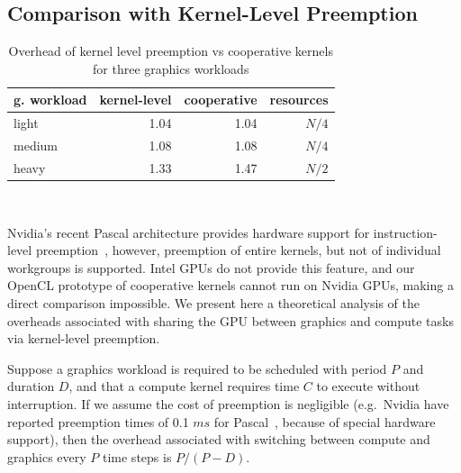 \documentclass[sigconf]{acmart}
\begin{document}
{%

\subsection{Comparison with Kernel-Level Preemption}\label{sec:nvidiacomparison}

\begin{table}[t]
\normalsize
\caption{Overhead of kernel level preemption vs cooperative kernels for three
graphics workloads}

\centering
\begin{tabular}{ l r r r}
g. workload &  kernel-level  & cooperative & resources \\
\hline
light & 1.04 & 1.04 & $N/4$\\
medium & 1.08 & 1.08 & $N/4$\\
heavy & 1.33 & 1.47 & $N/2$\\
\end{tabular} \\

\label{tab:preemption}
\end{table}

Nvidia's recent Pascal architecture provides hardware support for
instruction-level preemption~\cite{PascalWhitepaper,anandtech},
however, preemption of entire kernels, but not of individual
workgroups is supported.  Intel GPUs do not provide this feature, and
our OpenCL prototype of cooperative kernels cannot run on Nvidia GPUs,
making a direct comparison impossible.  We present here a theoretical
analysis of the overheads associated with sharing the GPU between
graphics and compute tasks via kernel-level preemption.

Suppose a graphics workload is required to be scheduled with period
$P$ and duration $D$, and that a compute kernel requires time $C$ to
execute without interruption.  If we assume the cost of preemption is
negligible (e.g.\ Nvidia have reported preemption times of 0.1
$\mathit{ms}$ for Pascal~\cite{anandtech}, because of
special hardware support), then the overhead associated with switching
between compute and graphics every $P$ time steps is $P/(P-D)$.

}
\end{document}
